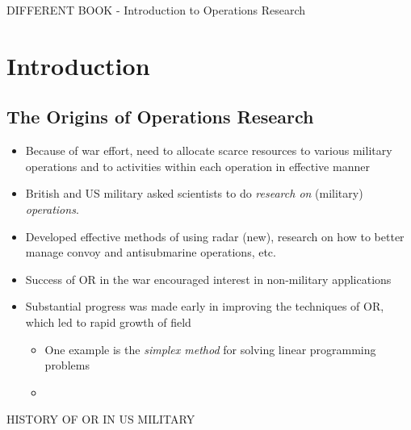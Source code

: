 \documentclass{article}
\begin{document}
%
%
%
%
%
%
\newpage
{\LARGE DIFFERENT BOOK - Introduction to Operations Research}
\setcounter{section}{0}
\section{Introduction}
\subsection{The Origins of Operations Research}
\begin{itemize}
\item Because of war effort, need to allocate scarce resources to various military operations and to activities within each operation in effective manner
\item British and US military asked scientists to do \textit{ research on } (military) \textit{ operations}.
\item Developed effective methods of using radar (new), research on how to better manage convoy and antisubmarine operations, etc.
\item Success of OR in the war encouraged interest in non-military applications
\item Substantial progress was made early in improving the techniques of OR, which led to rapid growth of field
	\begin{itemize}
	\item One example is the \textit{simplex method} for solving linear programming problems
    \item 
	\end{itemize}
\end{itemize}


%
%
%
%
%
%
%
\newpage
{\LARGE HISTORY OF OR IN US MILITARY}
\setcounter{section}{-1}
\end{document}
